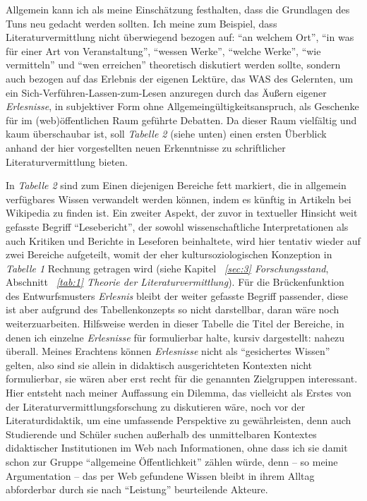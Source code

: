 \documentclass[fontsize=12pt]{scrartcl}
\begin{document}
Allgemein kann ich als meine Einsch\"atzung festhalten, dass die Grundlagen des Tuns neu gedacht werden sollten. Ich meine zum Beispiel, dass Li\-te\-ra\-tur\-ver\-mitt\-lung nicht \"uberwiegend bezogen auf: "`an welchem Ort"', "`in was f\"ur einer Art von Veranstaltung"', "`wessen Werke"', "`welche Werke"', "`wie vermitteln"' und "`wen er\-reichen"' theo\-retisch diskutiert werden sollte, sondern auch bezogen auf das Erlebnis der eigenen Lekt\"ure, das WAS des Gelernten, um ein Sich-Verf\"uhren-Lassen-zum-Lesen anzuregen durch das \"Au{\ss}ern eigener \textit{Erlesnisse}, in subjektiver Form ohne Allgemeing\"ultigkeitsanspruch, als Geschenke f\"ur im (web)\"of\-fent\-lichen Raum gef\"uhrte Debatten. Da dieser Raum vielf\"altig und kaum \"uberschaubar ist, soll \textit{Tabelle 2} (siehe unten) einen ersten \"Uberblick anhand der \mbox{hier} vorgestellten neuen Erkenntnisse zu schriftlicher Li\-te\-ra\-tur\-ver\-mitt\-lung bieten.

In \textit{Tabelle 2} sind zum Einen diejenigen Bereiche fett markiert, die in allgemein verf\"ugbares Wissen verwandelt werden k\"onnen, indem es k\"unftig in Artikeln bei Wi\-ki\-pe\-dia zu finden ist. Ein zweiter Aspekt, der zuvor in textueller Hinsicht weit gefasste Begriff "`Lesebericht"', der sowohl wissenschaftliche Interpretationen als auch Kritiken und Berichte in Leseforen beinhaltete, wird \mbox{hier} tentativ wieder auf zwei Bereiche aufgeteilt, womit der eher kultursoziologischen Konzeption in \textit{Tabelle 1} Rechnung getragen wird (siehe Kapitel \textit{~\ref{sec:3} For\-schungsstand}, Abschnitt \textit{~\ref{tab:1} Theo\-rie der Li\-te\-ra\-tur\-ver\-mit\-tlung}). F\"ur die Br\"uc\-ken\-funk\-tion des Entwurfsmusters \textit{Erlesnis} bleibt der weiter gefasste Begriff passender, diese ist aber aufgrund des Tabellenkonzepts so nicht darstellbar, daran w\"are noch weiterzuarbei\-ten. Hilfsweise werden in dieser Tabelle die Titel der Bereiche, in denen ich einzelne \textit{Erlesnisse} f\"ur formulierbar halte, kursiv dargestellt: nahezu \"uberall. Meines Erachtens k\"onnen \textit{Erlesnisse} nicht als "`gesichertes Wissen"' gelten, also sind sie allein in didaktisch ausgerichteten Kontexten nicht formulierbar, sie w\"aren aber erst recht f\"ur die ge\-nann\-ten Zielgruppen interessant. \mbox{Hier} entsteht nach meiner Auffassung ein Dilemma, das vielleicht als Erstes von der Li\-te\-ra\-tur\-ver\-mitt\-lungsfor\-schung zu diskutieren w\"are, noch vor der Li\-te\-ra\-tur\-didaktik, um eine umfassende Perspektive zu gew\"ahrleisten, denn auch Studierende und Sch\"uler\textsuperscript{\tiny *} suchen au{\ss}erhalb des unmittelbaren Kontextes didaktischer Institutionen im Web nach Informationen, ohne dass ich sie damit schon zur Gruppe "`allgemeine \"Of\-fent\-lichkeit"' z\"ahlen w\"urde, denn -- so meine Argumentation -- das per Web gefundene Wissen bleibt in ihrem All\-tag abforderbar durch sie nach "`Leistung"' beurteilende Akteure\textsuperscript{\tiny *}. 
\end{document}
